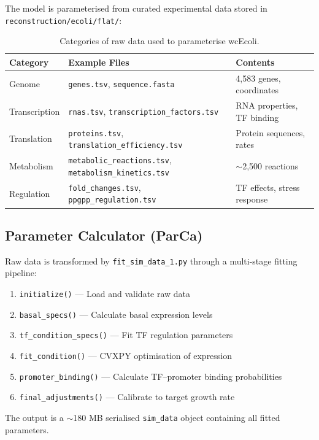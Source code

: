 \documentclass[11pt,a4paper]{report}
\begin{document}
The model is parameterised from curated experimental data stored in \texttt{reconstruction/ecoli/flat/}:

\begin{table}[h]
\centering
\begin{tabular}{lll}
\toprule
\textbf{Category} & \textbf{Example Files} & \textbf{Contents} \\
\midrule
Genome & \texttt{genes.tsv}, \texttt{sequence.fasta} & 4,583 genes, coordinates \\
Transcription & \texttt{rnas.tsv}, \texttt{transcription\_factors.tsv} & RNA properties, TF binding \\
Translation & \texttt{proteins.tsv}, \texttt{translation\_efficiency.tsv} & Protein sequences, rates \\
Metabolism & \texttt{metabolic\_reactions.tsv}, \texttt{metabolism\_kinetics.tsv} & $\sim$2,500 reactions \\
Regulation & \texttt{fold\_changes.tsv}, \texttt{ppgpp\_regulation.tsv} & TF effects, stress response \\
\bottomrule
\end{tabular}
\caption{Categories of raw data used to parameterise wcEcoli.}
\end{table}

\subsection{Parameter Calculator (ParCa)}

Raw data is transformed by \texttt{fit\_sim\_data\_1.py} through a multi-stage fitting pipeline:

\begin{enumerate}
    \item \texttt{initialize()} --- Load and validate raw data
    \item \texttt{basal\_specs()} --- Calculate basal expression levels
    \item \texttt{tf\_condition\_specs()} --- Fit TF regulation parameters
    \item \texttt{fit\_condition()} --- CVXPY optimisation of expression
    \item \texttt{promoter\_binding()} --- Calculate TF--promoter binding probabilities
    \item \texttt{final\_adjustments()} --- Calibrate to target growth rate
\end{enumerate}

The output is a $\sim$180 MB serialised \texttt{sim\_data} object containing all fitted parameters.
\end{document}
